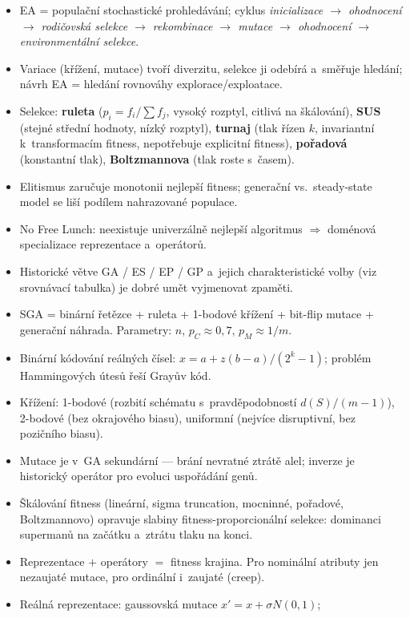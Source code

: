 \documentclass[11pt,a4paper]{article}
\theoremstyle{definition}
\begin{document}
\begin{itemize}
\item EA = populační stochastické prohledávání; cyklus \emph{inicializace $\to$
  ohodnocení $\to$ rodičovská selekce $\to$ rekombinace $\to$ mutace $\to$
  ohodnocení $\to$ environmentální selekce}.
\item Variace (křížení, mutace) tvoří diverzitu, selekce ji odebírá a~směřuje
  hledání; návrh EA = hledání rovnováhy explorace/exploatace.
\item Selekce: \textbf{ruleta} ($p_i = f_i/\sum f_j$, vysoký rozptyl, citlivá na
  škálování), \textbf{SUS} (stejné střední hodnoty, nízký rozptyl),
  \textbf{turnaj} (tlak řízen $k$, invariantní k~transformacím fitness, nepotřebuje
  explicitní fitness), \textbf{pořadová} (konstantní tlak),
  \textbf{Boltzmannova} (tlak roste s~časem).
\item Elitismus zaručuje monotonii nejlepší fitness; generační vs.\ steady-state
  model se liší podílem nahrazované populace.
\item No Free Lunch: neexistuje univerzálně nejlepší algoritmus $\Rightarrow$
  doménová specializace reprezentace a~operátorů.
\item Historické větve GA / ES / EP / GP a~jejich charakteristické volby
  (viz srovnávací tabulka) je dobré umět vyjmenovat zpaměti.
\item SGA = binární řetězce + ruleta + 1-bodové křížení + bit-flip mutace
  + generační náhrada. Parametry: $n$, $p_C \approx 0{,}7$, $p_M \approx 1/m$.
\item Binární kódování reálných čísel: $x = a + z(b-a)/(2^k-1)$; problém
  Hammingových útesů řeší Grayův kód.
\item Křížení: 1-bodové (rozbití schématu s~pravděpodobností $d(S)/(m-1)$),
  2-bodové (bez okrajového biasu), uniformní (nejvíce disruptivní, bez
  pozičního biasu).
\item Mutace je v~GA sekundární --- brání nevratné ztrátě alel; inverze je
  historický operátor pro evoluci uspořádání genů.
\item Škálování fitness (lineární, sigma truncation, mocninné, pořadové,
  Boltzmannovo) opravuje slabiny fitness-proporcionální selekce: dominanci
  supermanů na začátku a~ztrátu tlaku na konci.
\item Reprezentace $+$ operátory $=$ fitness krajina. Pro nominální atributy
  jen nezaujaté mutace, pro ordinální i~zaujaté (creep).
\item Reálná reprezentace: gaussovská mutace $x' = x + \sigma N(0,1)$;

\end{itemize}
\end{document}
